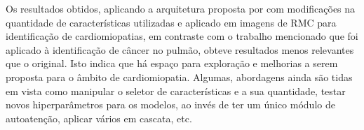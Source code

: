 Os resultados obtidos, aplicando a arquitetura proposta por  com modificações na quantidade de características utilizadas e aplicado em imagens de \gls{RMC} para identificação de cardiomiopatias, em contraste com o trabalho mencionado que foi aplicado à identificação de câncer no pulmão, obteve resultados menos relevantes que o original. Isto indica que há espaço para exploração e melhorias a serem proposta para o âmbito de cardiomiopatia. Algumas, abordagens ainda são tidas em vista como manipular o seletor de características e a sua quantidade, testar novos hiperparâmetros para os modelos, ao invés de ter um único módulo de autoatenção, aplicar vários em cascata, etc.

